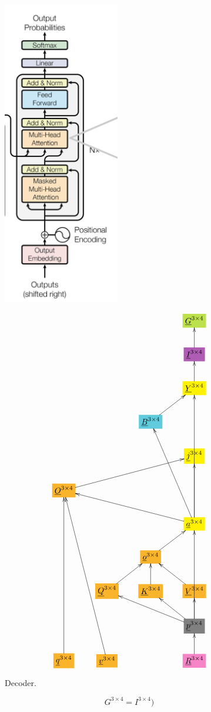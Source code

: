 \documentclass[12pt]{article}
\begin{document}
\begin{figure}[h!]\centering
\begin{minipage}{.5\linewidth}
\includegraphics[width=2in]{decoder.jpg}
\end{minipage}%
\begin{minipage}{.5\linewidth}
$$\xymatrix{
&&&*+[F*:SpringGreen]{\underline{G}^{3\times  4}}
\\
&&&*+[F*:Orchid]{\underline{I}^{3\times  4}}\ar[u]
\\
&&&*+[F*:yellow]{\underline{Y}^{3\times  4}}\ar[u]
\\
&&*+[F*:SkyBlue]{\underline{B}^{3\times  4}}\ar[ur]&
\\
&&&*+[F*:yellow]{\underline{j}^{3\times  4}}
\\
*+[F*:Dandelion]{\underline{O}^{3\times  4}}\ar[urrr]&&&
\\
&&&*+[F*:yellow]{\underline{a}^{3\times  4}}\ar[uuuu]\ar[uuul]\ar[uu]\ar[ulll]
\\
&&*+[F*:Dandelion]{\underline{o}^{3\times  4}}\ar[ur]&
\\
&*+[F*:Dandelion]{\underline{Q}^{3\times  4}}\ar[ur]&*+[F*:Dandelion]{\underline{K}^{3\times  4}}\ar[u]&*+[F*:Dandelion]{\underline{V}^{3\times  4}}\ar[ul]
\\
&&&*+[F*:gray]{\underline{p}^{3\times  4}}\ar[uuu]\ar[ull]\ar[ul]\ar[u]
\\
*+[F*:Dandelion]{\underline{q}^{3\times  4}}\ar[uuuuu]&*+[F*:Dandelion]{\underline{v}^{3\times  4}}\ar[uuuuul]&&*+[F*:Lavender]{\underline{R}^{3\times  4}}\ar[u]
}$$
\end{minipage}
\caption{Decoder.}
\label{fig-texnn-for-decoder}
\end{figure}\begin{subequations}
\begin{equation}
G^{3\times  4} = I^{3\times  4})
\label{eq-G-fun-decoder}
\end{equation}


\end{subequations}
\end{document}
